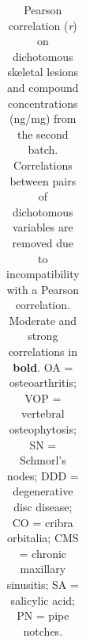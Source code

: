 \documentclass[
]{article}
\begin{document}
\begin{longtable}[]{@{}
  >{\raggedright\arraybackslash}p{}
  >{\raggedright\arraybackslash}p{}
  >{\raggedright\arraybackslash}p{}
  >{\raggedright\arraybackslash}p{}
  >{\raggedright\arraybackslash}p{}
  >{\raggedright\arraybackslash}p{}
  >{\raggedright\arraybackslash}p{}
  >{\raggedright\arraybackslash}p{}
  >{\raggedright\arraybackslash}p{}@{}}

\caption{\label{tbl-pearson}Pearson correlation (\emph{r}) on
dichotomous skeletal lesions and compound concentrations (ng/mg) from
the second batch. Correlations between pairs of dichotomous variables
are removed due to incompatibility with a Pearson correlation. Moderate
and strong correlations in \textbf{bold}. OA = osteoarthritis; VOP =
vertebral osteophytosis; SN = Schmorl's nodes; DDD = degenerative disc
disease; CO = cribra orbitalia; CMS = chronic maxillary sinusitis; SA =
salicylic acid; PN = pipe notches.}

\tabularnewline


\end{longtable}
\end{document}
